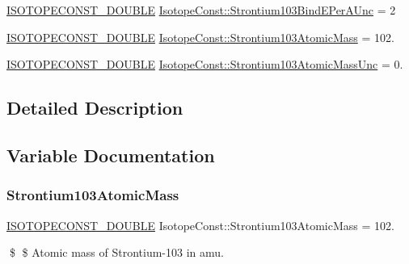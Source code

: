 \begin{DoxyCompactItemize}
\mbox{\hyperlink{group___isotope_const-_macros_ga8f45a7272ce02c0b4c65c44636ed719a}{I\+S\+O\+T\+O\+P\+E\+C\+O\+N\+S\+T\+\_\+\+D\+O\+U\+B\+LE}} \mbox{\hyperlink{group___isotope_const-_strontium-_sr103_ga638b82cf3193f915b7f1d712ab5d0862}{Isotope\+Const\+::\+Strontium103\+Bind\+E\+Per\+A\+Unc}} = 2
\item 
\mbox{\hyperlink{group___isotope_const-_macros_ga8f45a7272ce02c0b4c65c44636ed719a}{I\+S\+O\+T\+O\+P\+E\+C\+O\+N\+S\+T\+\_\+\+D\+O\+U\+B\+LE}} \mbox{\hyperlink{group___isotope_const-_strontium-_sr103_ga289e88a2c1a8ef3b765886411dccb8bc}{Isotope\+Const\+::\+Strontium103\+Atomic\+Mass}} = 102.
\item 
\mbox{\hyperlink{group___isotope_const-_macros_ga8f45a7272ce02c0b4c65c44636ed719a}{I\+S\+O\+T\+O\+P\+E\+C\+O\+N\+S\+T\+\_\+\+D\+O\+U\+B\+LE}} \mbox{\hyperlink{group___isotope_const-_strontium-_sr103_ga2304306bb16dc24cb8e31fbdd8aa111f}{Isotope\+Const\+::\+Strontium103\+Atomic\+Mass\+Unc}} = 0.
\end{DoxyCompactItemize}


\subsection{Detailed Description}


\subsection{Variable Documentation}
\mbox{\label{group___isotope_const-_strontium-_sr103_ga289e88a2c1a8ef3b765886411dccb8bc}} 
\subsubsection{\texorpdfstring{Strontium103\+Atomic\+Mass}{Strontium103AtomicMass}}
{\footnotesize\ttfamily \mbox{\hyperlink{group___isotope_const-_macros_ga8f45a7272ce02c0b4c65c44636ed719a}{I\+S\+O\+T\+O\+P\+E\+C\+O\+N\+S\+T\+\_\+\+D\+O\+U\+B\+LE}} Isotope\+Const\+::\+Strontium103\+Atomic\+Mass = 102.}

\$ \$ Atomic mass of Strontium-\/103 in amu. \mbox{\label{group___isotope_const-_strontium-_sr103_ga2304306bb16dc24cb8e31fbdd8aa111f}} 
